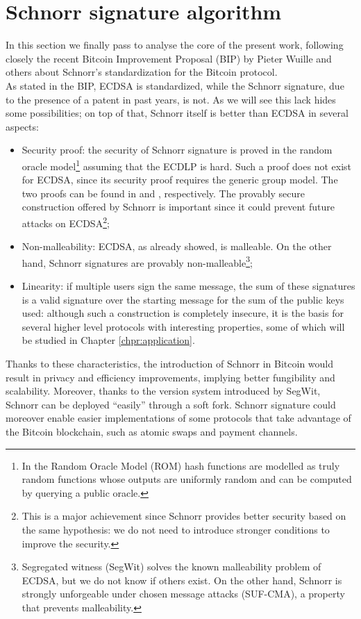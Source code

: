 \bigskip

\bigskip

\section{Schnorr signature algorithm}
\label{schnorr}
In this section we finally pass to analyse the core of the present work, following closely the recent Bitcoin Improvement Proposal (BIP) by Pieter Wuille and others \cite{RefWork:5} about Schnorr's standardization for the Bitcoin protocol.
\\
As stated in the BIP, ECDSA is standardized, while the Schnorr signature, due to the presence of a patent in past years, is not. As we will see this lack hides some possibilities; on top of that, Schnorr itself is better than ECDSA in several aspects:
\begin{itemize}
	\item Security proof: the security of Schnorr signature is proved in the random oracle model\footnote{In the Random Oracle Model (ROM) hash functions are modelled as truly random functions whose outputs are uniformly random and can be computed by querying a public oracle.} assuming that the ECDLP is hard. Such a proof does not exist for ECDSA, since its security proof requires the generic group model. The two proofs can be found in \cite{RefWork:8} and \cite{RefWork:9}, respectively. The provably secure construction offered by Schnorr is important since it could prevent future attacks on ECDSA\footnote{This is a major achievement since Schnorr provides better security based on the same hypothesis: we do not need to introduce stronger conditions to improve the security.};
	\item Non-malleability: ECDSA, as already showed, is malleable. On the other hand, Schnorr signatures are provably non-malleable\footnote{Segregated witness (SegWit) solves the known malleability problem of ECDSA, but we do not know if others exist. On the other hand, Schnorr is strongly unforgeable under chosen message attacks (SUF-CMA), a property that prevents malleability.};
	\item Linearity: if multiple users sign the same message, the sum of these signatures is a valid signature over the starting message for the sum of the public keys used: although such a construction is completely insecure, it is the basis for several higher level protocols with interesting properties, some of which will be studied in Chapter \ref{chpr:application}.
\end{itemize}
Thanks to these characteristics, the introduction of Schnorr in Bitcoin would result in privacy and efficiency improvements, implying better fungibility and scalability. Moreover, thanks to the version system introduced by SegWit, Schnorr can be deployed ``easily'' through a soft fork. Schnorr signature could moreover enable easier implementations of some protocols that take advantage of the Bitcoin blockchain, such as atomic swaps and payment channels.

